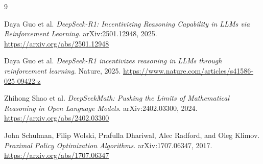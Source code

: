 \documentclass[11pt]{article}
\begin{document}
\begin{thebibliography}{9}

Daya Guo et al.
\newblock \emph{DeepSeek-R1: Incentivizing Reasoning Capability in LLMs via Reinforcement Learning}.
\newblock arXiv:2501.12948, 2025.
\newblock \url{https://arxiv.org/abs/2501.12948}

Daya Guo et al.
\newblock \emph{DeepSeek-R1 incentivizes reasoning in LLMs through reinforcement learning}.
\newblock Nature, 2025.
\newblock \url{https://www.nature.com/articles/s41586-025-09422-z}

Zhihong Shao et al.
\newblock \emph{DeepSeekMath: Pushing the Limits of Mathematical Reasoning in Open Language Models}.
\newblock arXiv:2402.03300, 2024.
\newblock \url{https://arxiv.org/abs/2402.03300}

John Schulman, Filip Wolski, Prafulla Dhariwal, Alec Radford, and Oleg Klimov.
\newblock \emph{Proximal Policy Optimization Algorithms}.
\newblock arXiv:1707.06347, 2017.
\newblock \url{https://arxiv.org/abs/1707.06347}

\end{thebibliography}
\end{document}
